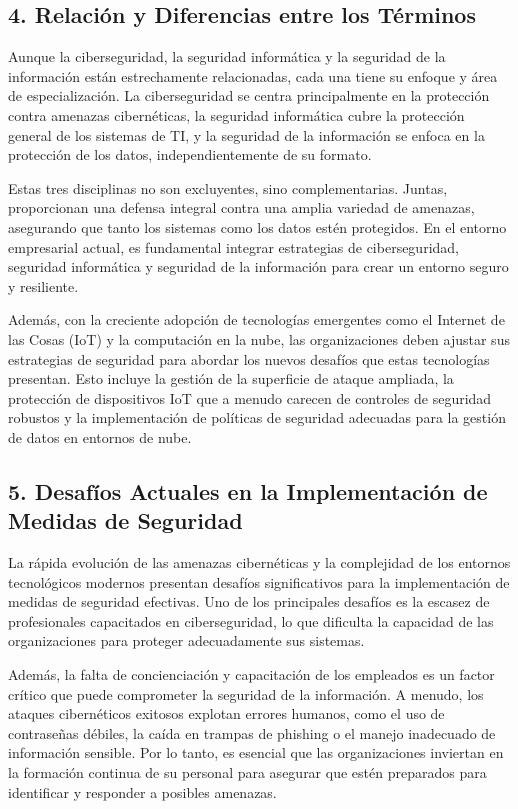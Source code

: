 \documentclass[12pt]{article}
\begin{document}
\subsection*{4. Relación y Diferencias entre los Términos}
Aunque la ciberseguridad, la seguridad informática y la seguridad de la información están estrechamente relacionadas, cada una tiene su enfoque y área de especialización. La ciberseguridad se centra principalmente en la protección contra amenazas cibernéticas, la seguridad informática cubre la protección general de los sistemas de TI, y la seguridad de la información se enfoca en la protección de los datos, independientemente de su formato.

Estas tres disciplinas no son excluyentes, sino complementarias. Juntas, proporcionan una defensa integral contra una amplia variedad de amenazas, asegurando que tanto los sistemas como los datos estén protegidos. En el entorno empresarial actual, es fundamental integrar estrategias de ciberseguridad, seguridad informática y seguridad de la información para crear un entorno seguro y resiliente.

Además, con la creciente adopción de tecnologías emergentes como el Internet de las Cosas (IoT) y la computación en la nube, las organizaciones deben ajustar sus estrategias de seguridad para abordar los nuevos desafíos que estas tecnologías presentan. Esto incluye la gestión de la superficie de ataque ampliada, la protección de dispositivos IoT que a menudo carecen de controles de seguridad robustos y la implementación de políticas de seguridad adecuadas para la gestión de datos en entornos de nube.

\subsection*{5. Desafíos Actuales en la Implementación de Medidas de Seguridad}
La rápida evolución de las amenazas cibernéticas y la complejidad de los entornos tecnológicos modernos presentan desafíos significativos para la implementación de medidas de seguridad efectivas. Uno de los principales desafíos es la escasez de profesionales capacitados en ciberseguridad, lo que dificulta la capacidad de las organizaciones para proteger adecuadamente sus sistemas.

Además, la falta de concienciación y capacitación de los empleados es un factor crítico que puede comprometer la seguridad de la información. A menudo, los ataques cibernéticos exitosos explotan errores humanos, como el uso de contraseñas débiles, la caída en trampas de phishing o el manejo inadecuado de información sensible. Por lo tanto, es esencial que las organizaciones inviertan en la formación continua de su personal para asegurar que estén preparados para identificar y responder a posibles amenazas.
\end{document}
